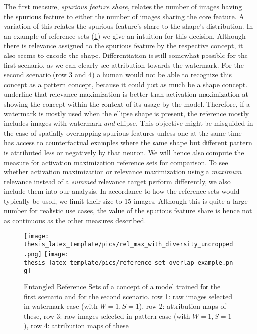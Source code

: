 The first measure, \textit{spurious feature share}, relates the number of images having the spurious feature to either the number of images sharing the core feature. A variation of this relates the spurious feature's share to the shape's distribution. In an example of reference sets (\cref{fig:entangled_ref_set}) we give an intuition for this decision. Although there is relevance assigned to the spurious feature by the respective concept, it also seems to encode the shape. Differentiation is still somewhat possible for the first scenario, as we can clearly see attribution towards the watermark. For the second scenario (row 3 and 4) a human would not be able to recognize this concept as a pattern concept, because it could just as much be a shape concept. 
\citet{Achtibat2022} underline that relevance maximization is better than activation maximization at showing the concept within the context of its usage by the model. Therefore, if a watermark is mostly used when the ellipse shape is present, the reference mostly includes images with watermark \textit{and} ellipse. This objective might be misguided in the case of spatially overlapping spurious features unless one at the same time has access to counterfactual examples where the same shape but different pattern is attributed less or negatively by that neuron. We will hence also compute the measure for activation maximization reference sets for comparison. To see whether activation maximization or relevance maximization using a \textit{maximum} relevance instead of a \textit{summed} relevance target perform differently, we also include them into our analysis. In accordance to how the reference sets would typically be used, we limit their size to 15 images. Although this is quite a large number for realistic use cases, the value of the spurious feature share is hence not as continuous as the other measures described. 

\begin{figure}[t!]
    \centering
    \texttt{[image: thesis\_latex\_template/pics/rel\_max\_with\_diversity\_uncropped.png]}
    \texttt{[image: thesis\_latex\_template/pics/reference\_set\_overlap\_example.png]}
    \caption[Entangled Reference Sets]{Entangled Reference Sets of a concept of a model trained for the first scenario and for the second scenario.
    row 1: raw images selected in watermark case (with $W=1, S=1$), row 2: attribution maps of these, 
    row 3: raw images selected in pattern case (with $W=1, S=1$), row 4: attribution maps of these}
    \label{fig:entangled_ref_set}
\end{figure}

